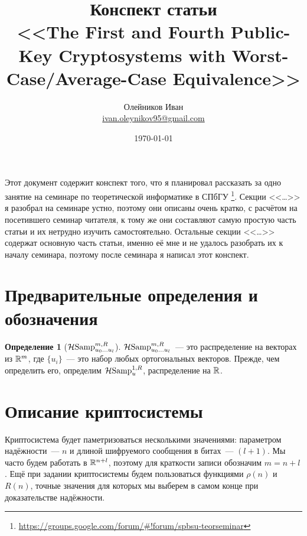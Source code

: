 \documentclass[oneside, a4paper]{article}
\theoremstyle{plain}
\theoremstyle{definition}
\newtheorem{defn}{Определение}
\theoremstyle{remark}
\newcommand\R{\ensuremath \mathbb R}
\newcommand\HS{\ensuremath \operatorname{\mathcal H Samp}}
\begin{document}
\title{Конспект статьи \\ \foreignlanguage{english}{<<The First and Fourth Public-Key Cryptosystems
with Worst-Case/Average-Case Equivalence>>  \cite{ajtaidwork}}}
\author{Олейников Иван \\ \url{ivan.oleynikov95@gmail.com}}
\date{\today}
\maketitle

Этот документ содержит конспект того, что я планировал рассказать за одно
занятие на семинаре по теоретической информатике в СПбГУ
\footnote{\url{https://groups.google.com/forum/\#!forum/spbsu-teorseminar}}.
Секции <<\dots>> я разобрал на семинаре устно, поэтому они описаны очень
кратко, с расчётом на посетившего семинар читателя, к тому же они составляют
самую простую часть статьи и их нетрудно изучить самостоятельно. Остальные
секции <<\dots>> содержат основную часть статьи,
именно её мне и не удалось разобрать их к началу семинара, поэтому после семинара
я написал этот конспект.

\tableofcontents

\section{Предварительные определения и обозначения}

\begin{defn}[$\HS^{m, R}_{u_0 \dots u_l}$]
$\HS^{m, R}_{u_0 \dots u_l}$~--- это распределение на векторах из $\R^m$, где $\{u_i\}$~--- это набор любых
ортогональных векторов. Прежде, чем определить его, определим $\HS^{1, R}_{u}$, распределение на $\R$.
\end{defn}

\newpage
\section{Описание криптосистемы}

Криптосистема будет паметризоваться несколькими значениями: параметром надёжности~--- $n$ и длиной шифруемого сообщения
в битах~--- $(l+1)$. Мы часто будем работать в $\R^{n+l}$, поэтому для краткости записи обозначим $m = n + l$. Ещё при
задании криптосистемы будем пользоваться функциями $\rho(n)$ и $R(n)$, точные значения для которых мы выберем в самом
конце при доказательстве надёжности.
\end{document}
